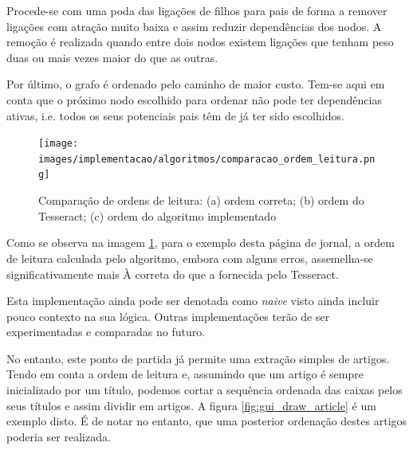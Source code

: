Procede-se com uma poda das ligações de filhos para pais de forma a remover ligações com atração muito baixa e assim reduzir dependências dos nodos. A remoção é realizada quando entre dois nodos existem ligações que tenham peso duas ou mais vezes maior do que as outras.

Por último, o grafo é ordenado pelo caminho de maior custo. Tem-se aqui em conta que o próximo nodo escolhido para ordenar não pode ter dependências ativas, i.e. todos os seus potenciais pais têm de já ter sido escolhidos.

\begin{figure}[H]
    \hspace*{-4.5cm}
    \texttt{[image: images/implementacao/algoritmos/comparacao\_ordem\_leitura.png]}
    \caption{Comparação de ordens de leitura: (a) ordem correta; (b) ordem do Tesseract; (c) ordem do algoritmo implementado}
    \label{fig:comp_reading_order}
\end{figure}

Como se observa na imagem \ref{fig:comp_reading_order}, para o exemplo desta página de jornal, a ordem de leitura calculada pelo algoritmo, embora com alguns erros, assemelha-se significativamente mais À correta do que a fornecida pelo Tesseract.



Esta implementação ainda pode ser denotada como \textit{naive} visto ainda incluir pouco contexto na sua lógica. Outras implementações terão de ser experimentadas e comparadas no futuro.

No entanto, este ponto de partida já permite uma extração simples de artigos. Tendo em conta a ordem de leitura e, assumindo que um artigo é sempre inicializado por um título, podemos cortar a sequência ordenada das caixas pelos seus títulos e assim dividir em artigos. A figura \ref{fig:gui_draw_article} é um exemplo disto. É de notar no entanto, que uma posterior ordenação destes artigos poderia ser realizada.
